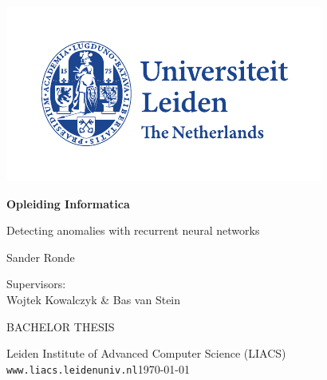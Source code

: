 \thispagestyle{empty}

\includegraphics{resources/logoleiden}

\vspace{-2.5cm}\hfill \begin{huge}\textbf{Opleiding Informatica}\end{huge}

\vspace{5cm}
\begin{Large}
\hfill Detecting anomalies with recurrent neural networks

\vspace*{25mm}

\hfill Sander Ronde
\end{Large}

\vspace*{4.5cm}

\begin{large}

Supervisors:\\
Wojtek  Kowalczyk \& Bas van Stein


\vspace*{2.8cm}
BACHELOR THESIS

\vspace*{5mm}
Leiden Institute of Advanced Computer Science (LIACS)\\
\texttt{www.liacs.leidenuniv.nl}\hfill \today
\end{large}

